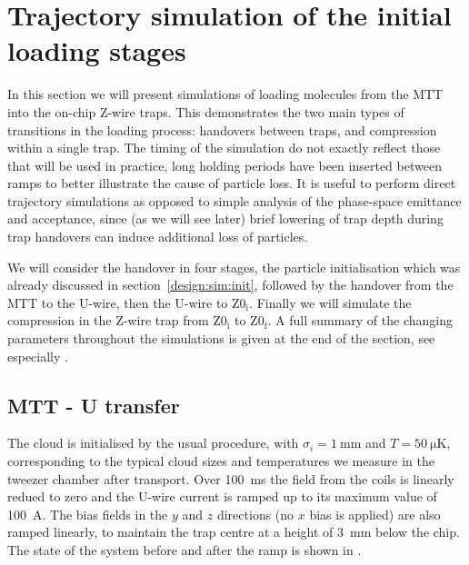 
\section{Trajectory simulation of the initial loading stages}

In this section we will present simulations of loading molecules from the MTT
into the on-chip Z-wire traps. 
This demonstrates
the two main types of transitions in the loading process: handovers between
traps, and compression within a single trap. The timing of the simulation do
not exactly reflect those that will be used in practice, long holding periods
have been inserted between ramps to better illustrate the cause of particle
loss. It is useful to perform direct trajectory simulations as opposed to
simple analysis of the phase-space emittance and acceptance, since (as we will
see later) brief lowering of trap depth during trap handovers can induce
additional loss of particles.

We will consider the handover in four stages, the particle initialisation which
was already discussed in section~\ref{design:sim:init}, followed by the
handover from the MTT to the U-wire, then the U-wire to $\mathrm{Z0_i}$.
Finally we will simulate the compression in the Z-wire trap from
$\mathrm{Z0_i}$ to $\mathrm{Z0_f}$. A full summary of the changing parameters
throughout the simulations is given at the end of the section, see especially
.

\subsection{MTT - U transfer}
\label{design:sim:trans_U}

The cloud is initialised by the usual procedure, with $\sigma_i =
\SI{1}{\milli\meter}$ and $T=\SI{50}{\micro\kelvin}$, corresponding to the
typical cloud sizes and temperatures we measure in the tweezer chamber after
transport. Over \SI{100}{\milli\second} the field from the coils is linearly
redued to zero and the U-wire current is ramped up to its maximum value of
\SI{100}{\ampere}. The bias fields in the $y$ and $z$ directions (no $x$ bias
is applied) are also ramped linearly, to maintain the trap centre at a height
of \SI{3}{\milli\meter} below the chip. The state of the system before and
after the ramp is shown in .

